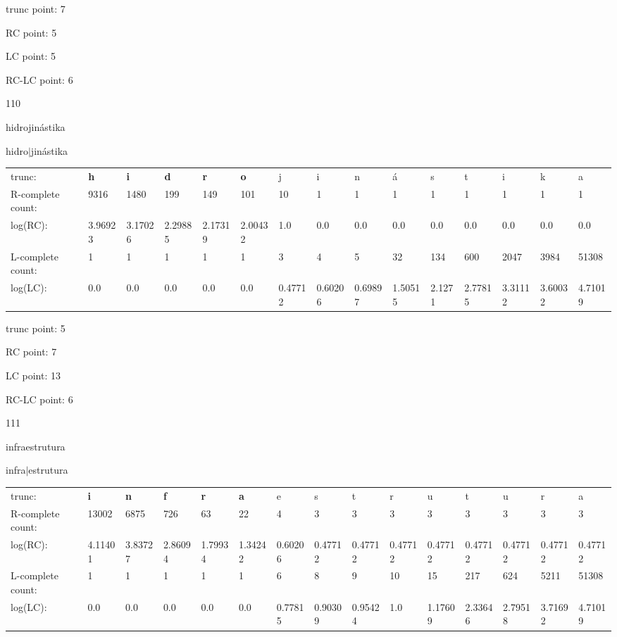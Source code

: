 \documentclass{article}
\begin{document}
trunc point: 7

RC point: 5

LC point: 5

RC-LC point: 6

\vspace{3em}



110

hidrojinástika

hidro$|$jinástika

\vspace{1em}

\begin{tabular}{l|llllllllllllll}

trunc: & {\color{red}\bf h} & {\color{red}\bf i} & {\color{red}\bf d} & {\color{red}\bf r} & {\color{red}\bf o} & j & i & n & á & s & t & i & k & a \\ 
R-complete count: & 9316 & 1480 & 199 & 149 & 101 & 10 & 1 & 1 & 1 & 1 & 1 & 1 & 1 & 1 \\ 
log(RC): & 3.96923 & 3.17026 & 2.29885 & 2.17319 & 2.00432 & 1.0 & 0.0 & 0.0 & 0.0 & 0.0 & 0.0 & 0.0 & 0.0 & 0.0 \\ 
L-complete count: & 1 & 1 & 1 & 1 & 1 & 3 & 4 & 5 & 32 & 134 & 600 & 2047 & 3984 & 51308 \\ 
log(LC): & 0.0 & 0.0 & 0.0 & 0.0 & 0.0 & 0.47712 & 0.60206 & 0.69897 & 1.50515 & 2.1271 & 2.77815 & 3.31112 & 3.60032 & 4.71019 \\ 
\end{tabular}

trunc point: 5

RC point: 7

LC point: 13

RC-LC point: 6

\vspace{3em}



111

infraestrutura

infra$|$estrutura

\vspace{1em}

\begin{tabular}{l|llllllllllllll}

trunc: & {\color{red}\bf i} & {\color{red}\bf n} & {\color{red}\bf f} & {\color{red}\bf r} & {\color{red}\bf a} & e & s & t & r & u & t & u & r & a \\ 
R-complete count: & 13002 & 6875 & 726 & 63 & 22 & 4 & 3 & 3 & 3 & 3 & 3 & 3 & 3 & 3 \\ 
log(RC): & 4.11401 & 3.83727 & 2.86094 & 1.79934 & 1.34242 & 0.60206 & 0.47712 & 0.47712 & 0.47712 & 0.47712 & 0.47712 & 0.47712 & 0.47712 & 0.47712 \\ 
L-complete count: & 1 & 1 & 1 & 1 & 1 & 6 & 8 & 9 & 10 & 15 & 217 & 624 & 5211 & 51308 \\ 
log(LC): & 0.0 & 0.0 & 0.0 & 0.0 & 0.0 & 0.77815 & 0.90309 & 0.95424 & 1.0 & 1.17609 & 2.33646 & 2.79518 & 3.71692 & 4.71019 \\ 
\end{tabular}
\end{document}
